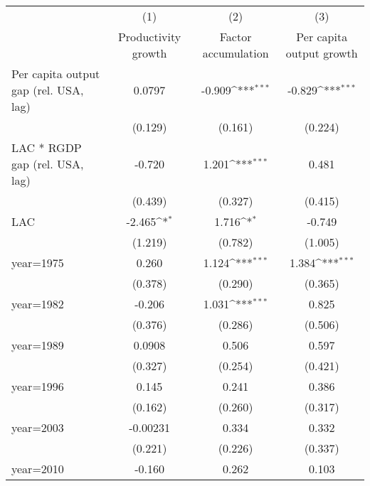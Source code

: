 {
\def\sym#1{\ifmmode^{#1}\else\(^{#1}\)\fi}
\begin{tabular}{l*{3}{c}}
\hline\hline
                    &\multicolumn{1}{c}{(1)}&\multicolumn{1}{c}{(2)}&\multicolumn{1}{c}{(3)}\\
                    &\multicolumn{1}{c}{Productivity growth}&\multicolumn{1}{c}{Factor accumulation}&\multicolumn{1}{c}{Per capita output growth}\\
\hline
Per capita output gap (rel. USA, lag)&      0.0797         &      -0.909\sym{***}&      -0.829\sym{***}\\
                    &     (0.129)         &     (0.161)         &     (0.224)         \\
[1em]
LAC * RGDP gap (rel. USA, lag)&      -0.720         &       1.201\sym{***}&       0.481         \\
                    &     (0.439)         &     (0.327)         &     (0.415)         \\
[1em]
LAC                 &      -2.465\sym{*}  &       1.716\sym{*}  &      -0.749         \\
                    &     (1.219)         &     (0.782)         &     (1.005)         \\
[1em]
year=1975           &       0.260         &       1.124\sym{***}&       1.384\sym{***}\\
                    &     (0.378)         &     (0.290)         &     (0.365)         \\
[1em]
year=1982           &      -0.206         &       1.031\sym{***}&       0.825         \\
                    &     (0.376)         &     (0.286)         &     (0.506)         \\
[1em]
year=1989           &      0.0908         &       0.506         &       0.597         \\
                    &     (0.327)         &     (0.254)         &     (0.421)         \\
[1em]
year=1996           &       0.145         &       0.241         &       0.386         \\
                    &     (0.162)         &     (0.260)         &     (0.317)         \\
[1em]
year=2003           &    -0.00231         &       0.334         &       0.332         \\
                    &     (0.221)         &     (0.226)         &     (0.337)         \\
[1em]
year=2010           &      -0.160         &       0.262         &       0.103         \\

\end{tabular}}
